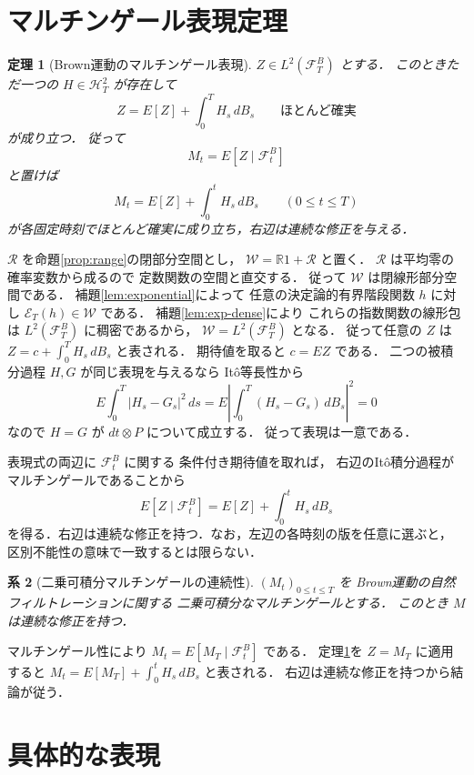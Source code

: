 \documentclass[a5paper,10pt,onecolumn]{jsarticle}
\makeatletter
\theoremstyle{mathnotetheorem}
\newtheorem{theorem}{定理}[section]
\newtheorem{corollary}[theorem]{系}
\renewcommand{\proofname}{証明}
\renewenvironment{proof}[1][\proofname]{%
  \par\pushQED{\qed}\normalfont\topsep4\p@\@plus2\p@\relax
  \trivlist\item[\hskip\labelsep\bfseries #1]\ignorespaces
}{\popQED\endtrivlist\@endpefalse}
\makeatother
\begin{document}
\section{マルチンゲール表現定理}

\begin{theorem}[Brown運動のマルチンゲール表現]\label{thm:mrt}
$Z\in L^2(\mathcal F_T^B)$ とする．
このときただ一つの $H\in\mathcal H^2_T$ が存在して
\[
 Z=E[Z]+\int_0^TH_s\,dB_s
 \qquad\text{ほとんど確実}
\]
が成り立つ．
従って
\[
 M_t=E[Z\mid\mathcal F_t^B]
\]
と置けば
\[
 M_t=E[Z]+\int_0^tH_s\,dB_s
 \qquad(0\le t\le T)
\]
が各固定時刻でほとんど確実に成り立ち，右辺は連続な修正を与える．
\end{theorem}
\begin{proof}
$\mathcal R$ を命題\ref{prop:range}の閉部分空間とし，
$\mathcal W=\mathbb R1+\mathcal R$ と置く．
$\mathcal R$ は平均零の確率変数から成るので
定数関数の空間と直交する．
従って $\mathcal W$ は閉線形部分空間である．
補題\ref{lem:exponential}によって
任意の決定論的有界階段関数 $h$ に対し
$\mathcal E_T(h)\in\mathcal W$ である．
補題\ref{lem:exp-dense}により
これらの指数関数の線形包は
$L^2(\mathcal F_T^B)$ に稠密であるから，
$\mathcal W=L^2(\mathcal F_T^B)$ となる．
従って任意の $Z$ は
$Z=c+\int_0^TH_s\,dB_s$ と表される．
期待値を取ると $c=EZ$ である．
二つの被積分過程 $H,G$ が同じ表現を与えるなら
It\^o等長性から
\[
 E\int_0^T|H_s-G_s|^2\,ds
 =E\left|\int_0^T(H_s-G_s)\,dB_s\right|^2=0
\]
なので $H=G$ が $dt\otimes P$ について成立する．
従って表現は一意である．

表現式の両辺に $\mathcal F_t^B$ に関する
条件付き期待値を取れば，
右辺のIt\^o積分過程がマルチンゲールであることから
\[
 E[Z\mid\mathcal F_t^B]
 =E[Z]+\int_0^tH_s\,dB_s
\]
を得る．右辺は連続な修正を持つ．なお，左辺の各時刻の版を任意に選ぶと，
区別不能性の意味で一致するとは限らない．
\end{proof}

\begin{corollary}[二乗可積分マルチンゲールの連続性]\label{cor:continuous}
$(M_t)_{0\le t\le T}$ を
Brown運動の自然フィルトレーションに関する
二乗可積分なマルチンゲールとする．
このとき $M$ は連続な修正を持つ．
\end{corollary}
\begin{proof}
マルチンゲール性により
$M_t=E[M_T\mid\mathcal F_t^B]$ である．
定理\ref{thm:mrt}を $Z=M_T$ に適用すると
$M_t=E[M_T]+\int_0^tH_s\,dB_s$ と表される．
右辺は連続な修正を持つから結論が従う．
\end{proof}

\section{具体的な表現}
\end{document}
